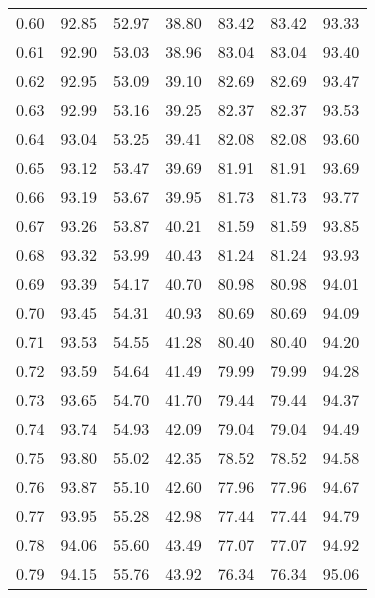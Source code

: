 \begin{tabular}{|c|c|c|c|c|c|c|}
      0.60 &     92.85 &     52.97 &      38.80 &   83.42 &      83.42 &         93.33 \\
      0.61 &     92.90 &     53.03 &      38.96 &   83.04 &      83.04 &         93.40 \\
      0.62 &     92.95 &     53.09 &      39.10 &   82.69 &      82.69 &         93.47 \\
      0.63 &     92.99 &     53.16 &      39.25 &   82.37 &      82.37 &         93.53 \\
      0.64 &     93.04 &     53.25 &      39.41 &   82.08 &      82.08 &         93.60 \\
      0.65 &     93.12 &     53.47 &      39.69 &   81.91 &      81.91 &         93.69 \\
      0.66 &     93.19 &     53.67 &      39.95 &   81.73 &      81.73 &         93.77 \\
      0.67 &     93.26 &     53.87 &      40.21 &   81.59 &      81.59 &         93.85 \\
      0.68 &     93.32 &     53.99 &      40.43 &   81.24 &      81.24 &         93.93 \\
      0.69 &     93.39 &     54.17 &      40.70 &   80.98 &      80.98 &         94.01 \\
      0.70 &     93.45 &     54.31 &      40.93 &   80.69 &      80.69 &         94.09 \\
      0.71 &     93.53 &     54.55 &      41.28 &   80.40 &      80.40 &         94.20 \\
      0.72 &     93.59 &     54.64 &      41.49 &   79.99 &      79.99 &         94.28 \\
      0.73 &     93.65 &     54.70 &      41.70 &   79.44 &      79.44 &         94.37 \\
      0.74 &     93.74 &     54.93 &      42.09 &   79.04 &      79.04 &         94.49 \\
      0.75 &     93.80 &     55.02 &      42.35 &   78.52 &      78.52 &         94.58 \\
      0.76 &     93.87 &     55.10 &      42.60 &   77.96 &      77.96 &         94.67 \\
      0.77 &     93.95 &     55.28 &      42.98 &   77.44 &      77.44 &         94.79 \\
      0.78 &     94.06 &     55.60 &      43.49 &   77.07 &      77.07 &         94.92 \\
      0.79 &     94.15 &     55.76 &      43.92 &   76.34 &      76.34 &         95.06 \\

\end{tabular}
